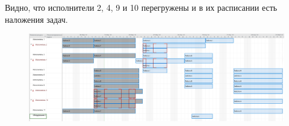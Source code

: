 Видно, что исполнители 2, 4, 9 и 10 перегружены и в их расписании есть наложения задач.

\begin{figure}[H]
	\begin{center}
		\includegraphics[width=\textwidth]{imgs/task_0_4.png}
	\end{center}
\end{figure}